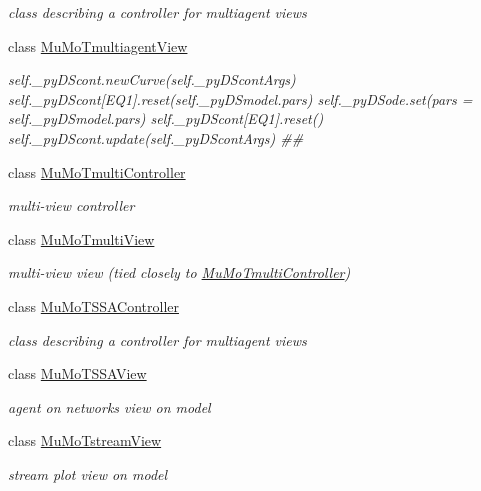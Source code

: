 \begin{DoxyCompactItemize}
\begin{DoxyCompactList}\small\item\em class describing a controller for multiagent views \end{DoxyCompactList}\item 
class \hyperlink{class_mu_mo_t_1_1_mu_mo_tmultiagent_view}{Mu\+Mo\+Tmultiagent\+View}
\begin{DoxyCompactList}\small\item\em self.\+\_\+py\+D\+Scont.\+new\+Curve(self.\+\_\+py\+D\+Scont\+Args) self.\+\_\+py\+D\+Scont\mbox{[}\textquotesingle{}E\+Q1\textquotesingle{}\mbox{]}.reset(self.\+\_\+py\+D\+Smodel.\+pars) self.\+\_\+py\+D\+Sode.\+set(pars = self.\+\_\+py\+D\+Smodel.\+pars) self.\+\_\+py\+D\+Scont\mbox{[}\textquotesingle{}E\+Q1\textquotesingle{}\mbox{]}.reset() self.\+\_\+py\+D\+Scont.\+update(self.\+\_\+py\+D\+Scont\+Args) \#\# \end{DoxyCompactList}\item 
class \hyperlink{class_mu_mo_t_1_1_mu_mo_tmulti_controller}{Mu\+Mo\+Tmulti\+Controller}
\begin{DoxyCompactList}\small\item\em multi-\/view controller \end{DoxyCompactList}\item 
class \hyperlink{class_mu_mo_t_1_1_mu_mo_tmulti_view}{Mu\+Mo\+Tmulti\+View}
\begin{DoxyCompactList}\small\item\em multi-\/view view (tied closely to \hyperlink{class_mu_mo_t_1_1_mu_mo_tmulti_controller}{Mu\+Mo\+Tmulti\+Controller}) \end{DoxyCompactList}\item 
class \hyperlink{class_mu_mo_t_1_1_mu_mo_t_s_s_a_controller}{Mu\+Mo\+T\+S\+S\+A\+Controller}
\begin{DoxyCompactList}\small\item\em class describing a controller for multiagent views \end{DoxyCompactList}\item 
class \hyperlink{class_mu_mo_t_1_1_mu_mo_t_s_s_a_view}{Mu\+Mo\+T\+S\+S\+A\+View}
\begin{DoxyCompactList}\small\item\em agent on networks view on model \end{DoxyCompactList}\item 
class \hyperlink{class_mu_mo_t_1_1_mu_mo_tstream_view}{Mu\+Mo\+Tstream\+View}
\begin{DoxyCompactList}\small\item\em stream plot view on model \end{DoxyCompactList}\item 

\end{DoxyCompactItemize}
